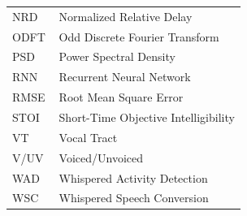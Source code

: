 \begin{flushleft}
\begin{tabular}{l p{0.8\linewidth}}
NRD & Normalized Relative Delay \\
ODFT & Odd Discrete Fourier Transform \\
PSD & Power Spectral Density \\
RNN & Recurrent Neural Network \\
RMSE & Root Mean Square Error \\
STOI & Short-Time Objective Intelligibility \\
VT & Vocal Tract \\
V/UV & Voiced/Unvoiced \\
WAD & Whispered Activity Detection \\
WSC & Whispered Speech Conversion \\
\end{tabular}
\end{flushleft}

